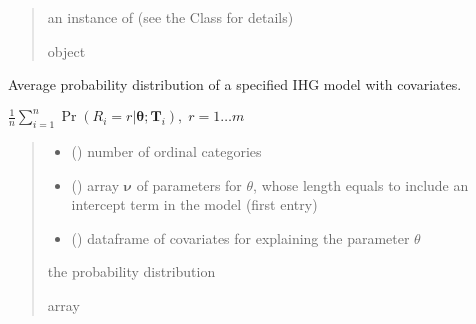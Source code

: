 \documentclass[letterpaper,10pt,english]{sphinxmanual}
\begin{document}
\begin{fulllineitems}
\begin{quote}
\begin{description}
\begin{itemize}
\end{itemize}

\sphinxAtStartPar
an instance of  (see the Class for details)

\sphinxAtStartPar
object

\end{description}\end{quote}

\end{fulllineitems}


\begin{fulllineitems}
\label{\detokenize{cubmods:cubmods.ihg_v.pmf}}
\pysigstartsignatures
{}
\pysigstopsignatures
\sphinxAtStartPar
Average probability distribution of a specified IHG model with covariates.

\sphinxAtStartPar
\(\frac{1}{n} \sum_{i=1}^n \Pr(R_i=r|\pmb\theta; \pmb T_i),\; r=1 \ldots m\)
\begin{quote}\begin{description}
\begin{itemize}
\item {} 
\sphinxAtStartPar
{} () \textendash{} number of ordinal categories

\item {} 
\sphinxAtStartPar
{} () \textendash{} array \(\pmb \nu\) of parameters for \(\theta\), whose length equals 
 to include an intercept term in the model (first entry)

\item {} 
\sphinxAtStartPar
{} () \textendash{} dataframe of covariates for explaining the parameter \(\theta\)

\end{itemize}

\sphinxAtStartPar
the probability distribution

\sphinxAtStartPar
array

\end{description}\end{quote}

\end{fulllineitems}
\end{document}
